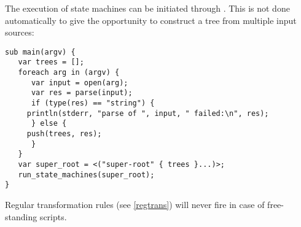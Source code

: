 The execution
of state machines can be initiated through
. This is not
done automatically to give the opportunity to construct a tree from
multiple input sources:

\begin{lstlisting}
sub main(argv) {
   var trees = [];
   foreach arg in (argv) {
      var input = open(arg);
      var res = parse(input);
      if (type(res) == "string") {
	 println(stderr, "parse of ", input, " failed:\n", res);
      } else {
	 push(trees, res);
      }
   }
   var super_root = <("super-root" { trees }...)>;
   run_state_machines(super_root);
}
\end{lstlisting}

Regular transformation rules (see \ref{regtrans})
will never fire in case of free-standing scripts.

\endinput
